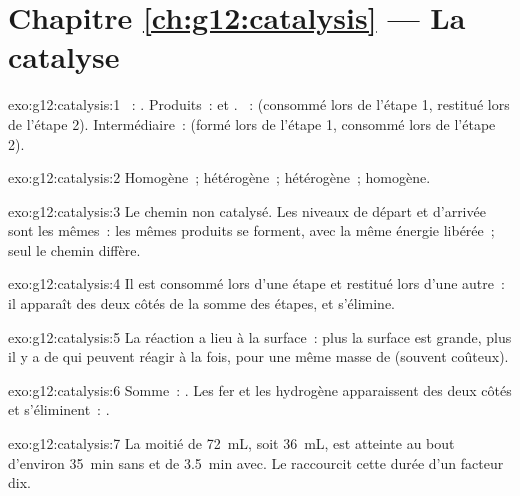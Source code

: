 \section*{Chapitre \ref{ch:g12:catalysis} --- La catalyse}

\begin{solution}{exo:g12:catalysis:1}
~: . Produits~:  et . ~:
 (consommé lors de l'étape 1, restitué lors de l'étape 2).
Intermédiaire~:  (formé lors de l'étape 1, consommé lors de
l'étape 2).
\end{solution}

\begin{solution}{exo:g12:catalysis:2}
Homogène~; hétérogène~; hétérogène~; homogène.
\end{solution}

\begin{solution}{exo:g12:catalysis:3}
Le chemin non catalysé. Les niveaux de départ et d'arrivée sont les
mêmes~: les mêmes produits se forment, avec la même énergie libérée~;
seul le chemin diffère.
\end{solution}

\begin{solution}{exo:g12:catalysis:4}
Il est consommé lors d'une étape et restitué lors d'une autre~: il
apparaît des deux côtés de la somme des étapes, et s'élimine.
\end{solution}

\begin{solution}{exo:g12:catalysis:5}
La réaction a lieu à la surface~: plus la surface est grande, plus il y
a de  qui peuvent réagir à la fois, pour une même masse de
 (souvent coûteux).
\end{solution}

\begin{solution}{exo:g12:catalysis:6}
Somme~: . Les  fer et les  hydrogène apparaissent des
deux côtés et s'éliminent~: .
\end{solution}

\begin{solution}{exo:g12:catalysis:7}
La moitié de \qty{72}{mL}, soit \qty{36}{mL}, est atteinte au bout
d'environ \qty{35}{min} sans  et de \qty{3.5}{min} avec. Le
 raccourcit cette durée d'un facteur dix.
\end{solution}

